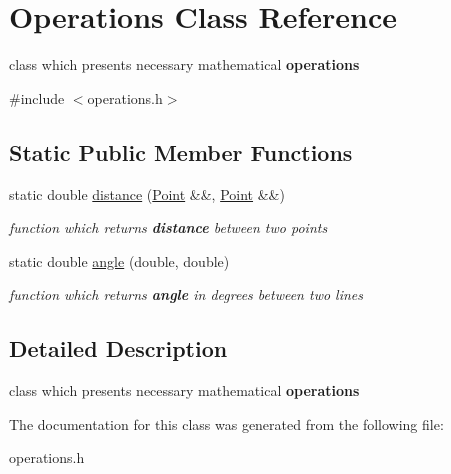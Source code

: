 \hypertarget{class_operations}{}\section{Operations Class Reference}
\label{class_operations}


class which presents necessary mathematical {\bfseries{operations}}  




{\ttfamily \#include $<$operations.\+h$>$}

\subsection*{Static Public Member Functions}
\begin{DoxyCompactItemize}
\item 
\mbox{\label{class_operations_abb4d9cb615dea19d5a8c36be12f1a1e0}} 
static double \mbox{\hyperlink{class_operations_abb4d9cb615dea19d5a8c36be12f1a1e0}{distance}} (\mbox{\hyperlink{class_point}{Point}} \&\&, \mbox{\hyperlink{class_point}{Point}} \&\&)
\begin{DoxyCompactList}\small\item\em {\itshape function} which returns {\bfseries{distance}} between two {\itshape points} \end{DoxyCompactList}\item 
\mbox{\label{class_operations_ae6075f65162a79185900e892b501073c}} 
static double \mbox{\hyperlink{class_operations_ae6075f65162a79185900e892b501073c}{angle}} (double, double)
\begin{DoxyCompactList}\small\item\em {\itshape function} which returns {\bfseries{angle}} in {\itshape degrees} between two lines \end{DoxyCompactList}\end{DoxyCompactItemize}


\subsection{Detailed Description}
class which presents necessary mathematical {\bfseries{operations}} 

The documentation for this class was generated from the following file\+:\begin{DoxyCompactItemize}
\item 
operations.\+h\end{DoxyCompactItemize}
